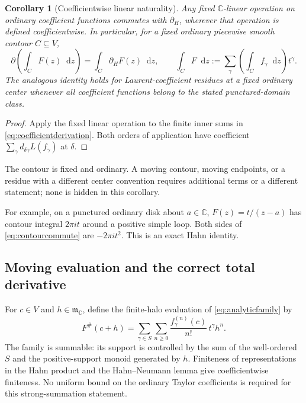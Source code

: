 \documentclass[11pt,a4paper]{article}
\newtheorem{corollary}[theorem]{Corollary}
\theoremstyle{definition}
\newcommand{\C}{\mathbb C}
\newcommand{\D}{\partial}
\newcommand{\mm}{\mathfrak m}
\newcommand{\dd}{\mathop{}\!\mathrm d}
\numberwithin{equation}{section}
\begin{document}
\begin{corollary}[Coefficientwise linear naturality]\label{cor:naturality}
Any fixed $\C$-linear operation on ordinary coefficient functions commutes
with $\D_H$, wherever that operation is defined coefficientwise. In
particular, for a fixed ordinary piecewise smooth contour $C\subseteq V$,
\begin{equation}\label{eq:contourcommute}
 \D\left(\int_C F(z)\dd z\right)
 =\int_C\D_HF(z)\dd z,
 \qquad
 \int_C F\dd z:=\sum_\gamma
      \left(\int_C f_\gamma\dd z\right)t^\gamma.
\end{equation}
The analogous identity holds for Laurent-coefficient residues at a fixed
ordinary center whenever all coefficient functions belong to the stated
punctured-domain class.
\end{corollary}
\begin{proof}
Apply the fixed linear operation to the finite inner sums in
\eqref{eq:coefficientderivation}. Both orders of application have
coefficient $\sum_\gamma d_{\delta\gamma}L(f_\gamma)$ at $\delta$.
\end{proof}
The contour is fixed and ordinary. A moving contour, moving endpoints,
or a residue with a different center convention requires additional
terms or a different statement; none is hidden in this corollary.

For example, on a punctured ordinary disk about $a\in\C$,
$F(z)=t/(z-a)$ has contour integral $2\pi it$ around a positive simple
loop. Both sides of \eqref{eq:contourcommute} are $-2\pi it^2$. This is
an exact Hahn identity.

\subsection{Moving evaluation and the correct total derivative}
For $c\in V$ and $h\in\mm_\C$, define the finite-halo evaluation of
\eqref{eq:analyticfamily} by
\begin{equation}\label{eq:haloevaluation}
 F^\#(c+h)=
 \sum_{\gamma\in S}\sum_{n\ge0}
     \frac{f_\gamma^{(n)}(c)}{n!}\,t^\gamma h^n.
\end{equation}
The family is summable: its support is controlled by the sum of the
well-ordered $S$ and the positive-support monoid generated by $h$.
Finiteness of representations in the Hahn product and the
Hahn--Neumann lemma give coefficientwise finiteness. No uniform bound on
the ordinary Taylor coefficients is required for this strong-summation
statement.
\end{document}
